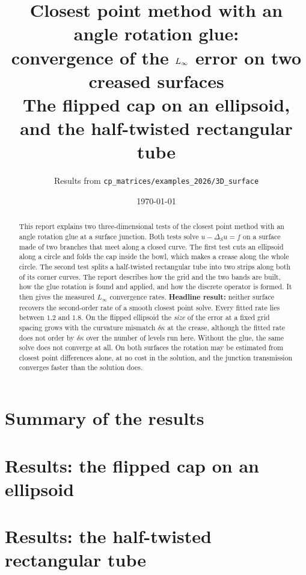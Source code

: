 \documentclass[11pt,a4paper]{article}
\title{\vspace{-1.2cm}
  Closest point method with an angle rotation glue:\\
  convergence of the $\Linf$ error on two creased surfaces\\[2mm]
  \large The flipped cap on an ellipsoid, and the half-twisted
  rectangular tube}
\author{Results from \texttt{cp\_matrices/examples\_2026/3D\_surface}}
\date{\today}
\newcommand{\dk}{\delta\kappa}
\newcommand{\Linf}{L_\infty}
\begin{document}
\maketitle
\thispagestyle{fancy}

\begin{abstract}
\noindent
This report explains two three-dimensional tests of the closest point
method with an angle rotation glue at a surface junction. Both tests
solve $u-\Delta_S u = f$ on a surface made of two branches that meet
along a closed curve. The first test cuts an ellipsoid along a circle and
folds the cap inside the bowl, which makes a crease along the whole
circle. The second test splits a half-twisted rectangular tube into two
strips along both of its corner curves. The report describes how the grid
and the two bands are built, how the glue rotation is found and applied,
and how the discrete operator is formed. It then gives the measured
$\Linf$ convergence rates. \textbf{Headline result:} neither surface
recovers the second-order rate of a smooth closest point solve. Every
fitted rate lies between $1.2$ and $1.8$. On the flipped ellipsoid the
\emph{size} of the error at a fixed grid spacing grows with the curvature
mismatch $\dk$ at the crease, although the fitted rate does not order by
$\dk$ over the number of levels run here. Without the glue, the same
solve does not converge at all. On both surfaces the rotation may be
estimated from closest point differences alone, at no cost in the
solution, and the junction transmission converges faster than the
solution does.
\end{abstract}

\tableofcontents

\section{Summary of the results}
\label{sec:summary}





\section{Results: the flipped cap on an ellipsoid}
\label{sec:ellres}



\section{Results: the half-twisted rectangular tube}
\label{sec:tuberes}
\end{document}
